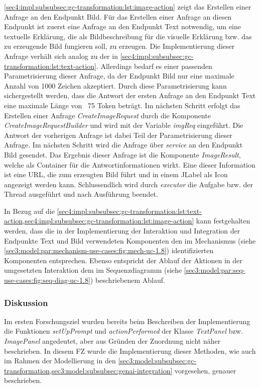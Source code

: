 \cref{sec4:impl:subsubsec:gc-transformation:lst:image-action} zeigt das Erstellen einer Anfrage an den Endpunkt Bild.
Für das Erstellen einer Anfrage an diesen Endpunkt ist zuerst eine Anfrage an den Endpunkt Text notwendig, um eine textuelle Erklärung, die als Bildbeschreibung für die visuelle Erklärung bzw. das zu erzeugende Bild fungieren soll, zu erzeugen.
Die Implementierung dieser Anfrage verhält sich analog zu der in \cref{sec4:impl:subsubsec:gc-transformation:lst:text-action}.
Allerdings bedarf es einer passenden Parametrisierung dieser Anfrage, da der Endpunkt Bild nur eine maximale Anzahl von 1000 Zeichen akzeptiert.
Durch diese Parametrisierung kann sichergestellt werden, dass die Antwort der ersten Anfrage an den Endpunkt Text eine maximale Länge von ~75 Token beträgt.
Im nächsten Schritt erfolgt das Erstellen einer Anfrage \textit{CreateImageRequest} durch die Komponente \textit{CreateImageRequestBuilder} und wird mit der Variable \textit{imgReq} eingeführt.
Die Antwort der vorherigen Anfrage ist dabei Teil der Parametrisierung dieser Anfrage.
Im nächsten Schritt wird die Anfrage über \textit{service} an den Endpunkt Bild gesendet.
Das Ergebnis dieser Anfrage ist die Komponente \textit{ImageResult}, welche als Container für die Antwortinformationen wirkt.
Eine dieser Information ist eine URL, die zum erzeugten Bild führt und in einem JLabel als Icon angezeigt werden kann.
Schlussendlich wird durch \textit{executor} die Aufgabe bzw. der Thread ausgeführt und nach Ausführung beendet.

In Bezug auf die \cref{sec4:impl:subsubsec:gc-transformation:lst:text-action,sec4:impl:subsubsec:gc-transformation:lst:image-action} kann festgehalten werden, dass die in der Implementierung der Interaktion und Integration der Endpunkte Text und Bild verwendeten Komponenten den im Mechanismus (siehe \cref{sec3:model:par:mechanism-use-cases:fig:mech-uc-1.8}) identifizierten Komponenten entsprechen.
Ebenso entspricht der Ablauf der Aktionen in der umgesetzten Interaktion dem im Sequenzdiagramm (siehe \cref{sec3:model:par:seq-use-cases:fig:seq-diag-uc-1.8}) beschriebenem Ablauf.

\subsubsection{Diskussion}
\label{sec4:impl:subsubsec:fz2:discussion}
Im ersten Forschungsziel wurden bereits beim Beschreiben der Implementierung die Funktionen \textit{setUpPrompt} und \textit{actionPerformed} der Klasse \textit{TextPanel} bzw. \textit{ImagePanel} angedeutet, aber aus Gründen der Zuordnung nicht näher beschrieben.
In diesem FZ wurde die Implementierung dieser Methoden, wie auch im Rahmen der Modellierung in den \cref{sec3:model:subsubsec:gc-transformation,sec3:model:subsubsec:genai-integration} vorgesehen, genauer beschrieben.

